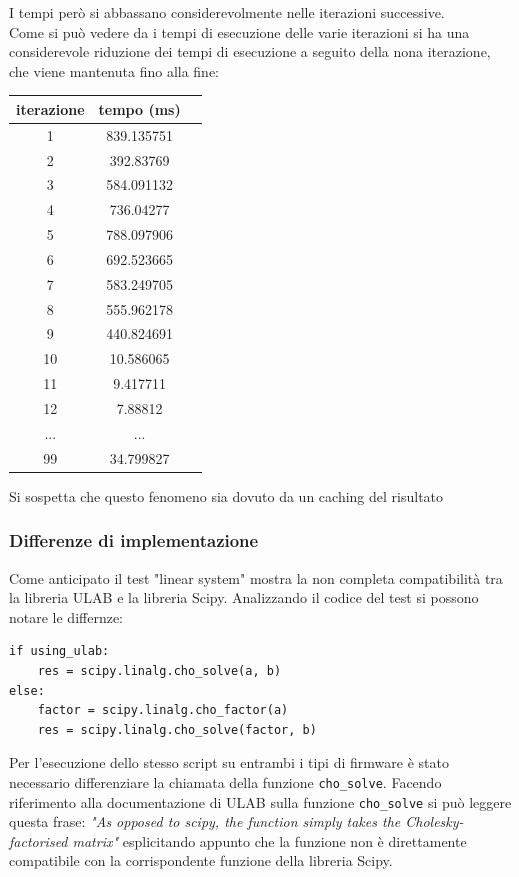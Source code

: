 \documentclass[12pt,a4paper]{report}
\begin{document}
I tempi però si abbassano considerevolmente nelle iterazioni
successive.\\
Come si può vedere da i tempi di esecuzione delle varie iterazioni si ha
una considerevole riduzione dei tempi di esecuzione a seguito della nona
iterazione, che viene mantenuta fino alla fine:

\begin{center}
\begin{tabular}{|c | c | c |}
\hline
iterazione & tempo (ms) \\
\hline
1 & 839.135751 \\
2 & 392.83769 \\
3 & 584.091132 \\
4 & 736.04277 \\
5 & 788.097906 \\
6 & 692.523665 \\
7 & 583.249705 \\
8 & 555.962178 \\
9 & 440.824691 \\
10 & 10.586065 \\
11 & 9.417711 \\
12 & 7.88812 \\
... & ... \\
\hline
99 & 34.799827 \\
\hline
\end{tabular}
\end{center}

Si sospetta che questo fenomeno sia dovuto da un caching del risultato

\subsubsection{Differenze di implementazione}

Come anticipato il test "linear system" mostra la non completa compatibilità tra la libreria ULAB e la libreria Scipy.
Analizzando il codice del test si possono notare le differnze:

\begin{verbatim}
if using_ulab:
    res = scipy.linalg.cho_solve(a, b)
else:  
    factor = scipy.linalg.cho_factor(a)
    res = scipy.linalg.cho_solve(factor, b)
\end{verbatim}

Per l'esecuzione dello stesso script su entrambi i tipi di firmware è stato necessario differenziare la chiamata della funzione 
\texttt{cho\_solve}. Facendo riferimento alla documentazione di ULAB sulla funzione \texttt{cho\_solve} \cite{ulab_cholesky} si 
può leggere questa frase: \textit{"As opposed to scipy, the function simply takes the Cholesky-factorised matrix"} esplicitando appunto che la funzione non è direttamente compatibile con la corrispondente funzione della libreria Scipy.\\
\end{document}
